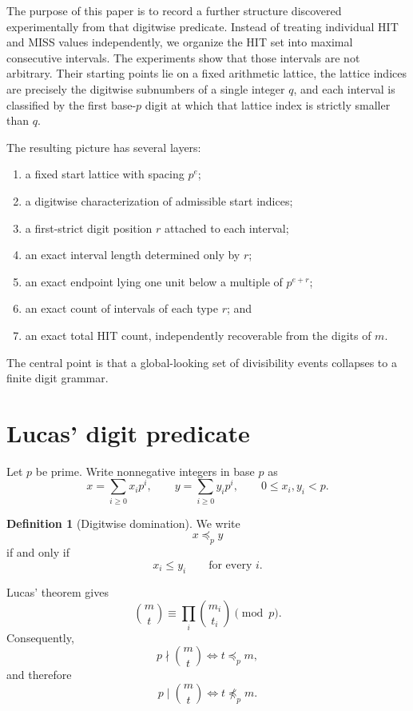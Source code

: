 \documentclass[11pt,a4paper]{article}
\theoremstyle{definition}
\newtheorem{definition}[theorem]{Definition}
\theoremstyle{remark}
\begin{document}
The purpose of this paper is to record a further structure discovered experimentally from that digitwise predicate.  Instead of treating individual HIT and MISS values independently, we organize the HIT set into maximal consecutive intervals.  The experiments show that those intervals are not arbitrary.  Their starting points lie on a fixed arithmetic lattice, the lattice indices are precisely the digitwise subnumbers of a single integer $q$, and each interval is classified by the first base-$p$ digit at which that lattice index is strictly smaller than $q$.

The resulting picture has several layers:
\begin{enumerate}[label=(\roman*)]
  \item a fixed start lattice with spacing $p^e$;
  \item a digitwise characterization of admissible start indices;
  \item a first-strict digit position $r$ attached to each interval;
  \item an exact interval length determined only by $r$;
  \item an exact endpoint lying one unit below a multiple of $p^{e+r}$;
  \item an exact count of intervals of each type $r$; and
  \item an exact total HIT count, independently recoverable from the digits of $m$.
\end{enumerate}

The central point is that a global-looking set of divisibility events collapses to a finite digit grammar.

\section{Lucas' digit predicate}

Let $p$ be prime.  Write nonnegative integers in base $p$ as
\[
 x=\sum_{i\ge 0}x_i p^i,
 \qquad
 y=\sum_{i\ge 0}y_i p^i,
 \qquad
 0\le x_i,y_i<p.
\]

\begin{definition}[Digitwise domination]
We write
\[
 x\preceq_p y
\]
if and only if
\[
 x_i\le y_i
\qquad\text{for every }i.
\]
\end{definition}

Lucas' theorem gives
\[
 \binom{m}{t}
 \equiv
 \prod_i \binom{m_i}{t_i}
 \pmod p.
\]
Consequently,
\[
 p\nmid \binom{m}{t}
 \iff t\preceq_p m,
\]
and therefore
\[
 p\mid \binom{m}{t}
 \iff t\not\preceq_p m.
\]
\end{document}
